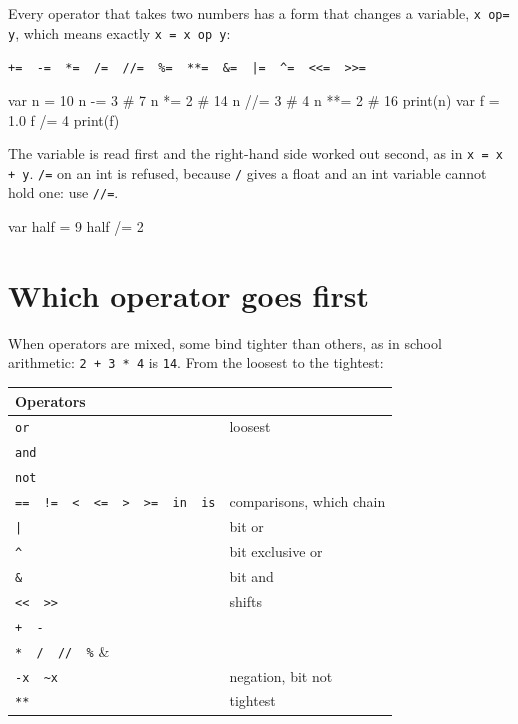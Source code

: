 Every operator that takes two numbers has a form that changes a
variable, \verb|x op= y|, which means exactly \verb|x = x op y|:

\begin{center}
\verb|+=  -=  *=  /=  //=  %=  **=  &=  |\verb!|=!\verb|  ^=  <<=  >>=|
\end{center}

\begin{zeno}
var n = 10
n -= 3        # 7
n *= 2        # 14
n //= 3       # 4
n **= 2       # 16
print(n)
var f = 1.0
f /= 4
print(f)
\end{zeno}

The variable is read first and the right-hand side worked out second,
as in \verb|x = x + y|. \verb|/=| on an int is refused, because
\verb|/| gives a float and an int variable cannot hold one: use
\verb|//=|.

\begin{zeno}[fails=yes]
var half = 9
half /= 2
\end{zeno}

\section{Which operator goes first}

When operators are mixed, some bind tighter than others, as in school
arithmetic: \verb|2 + 3 * 4| is \verb|14|. From the loosest to the
tightest:

\begin{center}
\begin{tabular}{ll}
\toprule
Operators & \\
\midrule
\verb|or| & loosest \\
\verb|and| & \\
\verb|not| & \\
\verb|==  !=  <  <=  >  >=  in  is| & comparisons, which chain \\
\verb!|! & bit or \\
\verb|^| & bit exclusive or \\
\verb|&| & bit and \\
\verb|<<  >>| & shifts \\
\verb|+  -| & \\
\verb|*  /  //  %| & \\
\verb|-x  ~x| & negation, bit not \\
\verb|**| & tightest \\
\bottomrule
\end{tabular}
\end{center}


